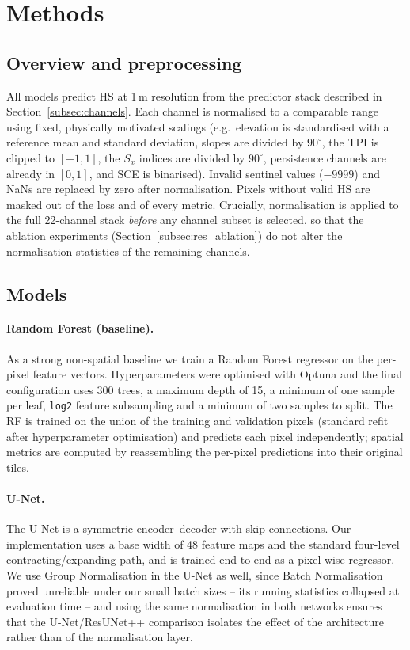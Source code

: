\section{Methods}
\label{sec:methods}

\subsection{Overview and preprocessing}
\label{subsec:preproc}

All models predict HS at 1\,m resolution from the predictor stack described in
Section~\ref{subsec:channels}. Each channel is normalised to a comparable
range using fixed, physically motivated scalings (e.g.\ elevation is
standardised with a reference mean and standard deviation, slopes are divided
by $90^\circ$, the TPI is clipped to $[-1,1]$, the $S_x$ indices are divided by
$90^\circ$, persistence channels are already in $[0,1]$, and SCE is binarised).
Invalid sentinel values ($-9999$) and NaNs are replaced by zero after
normalisation. Pixels without valid HS are masked out of the loss and of every
metric. Crucially, normalisation is applied to the full 22-channel stack
\emph{before} any channel subset is selected, so that the ablation experiments
(Section~\ref{subsec:res_ablation}) do not alter the normalisation statistics
of the remaining channels.

\subsection{Models}
\label{subsec:models}

\paragraph{Random Forest (baseline).}
As a strong non-spatial baseline we train a Random Forest regressor
\citep{breiman2001} on the per-pixel feature vectors. Hyperparameters were
optimised with Optuna \citep{akiba2019} and the final configuration uses
300 trees, a maximum depth of 15, a minimum of one sample per leaf,
\texttt{log2} feature subsampling and a minimum of two samples to split. The
RF is trained on the union of the training and validation pixels (standard
refit after hyperparameter optimisation) and predicts each pixel
independently; spatial metrics are computed by reassembling the per-pixel
predictions into their original tiles.

\paragraph{U-Net.}
The U-Net \citep{ronneberger2015} is a symmetric encoder--decoder with skip
connections. Our implementation uses a base width of 48 feature maps and the
standard four-level contracting/expanding path, and is trained end-to-end as a
pixel-wise regressor. We use Group Normalisation in the U-Net as well, since
Batch Normalisation proved unreliable under our small batch sizes -- its running
statistics collapsed at evaluation time -- and using the same normalisation in
both networks ensures that the U-Net/ResUNet++ comparison isolates the effect of
the architecture rather than of the normalisation layer.

